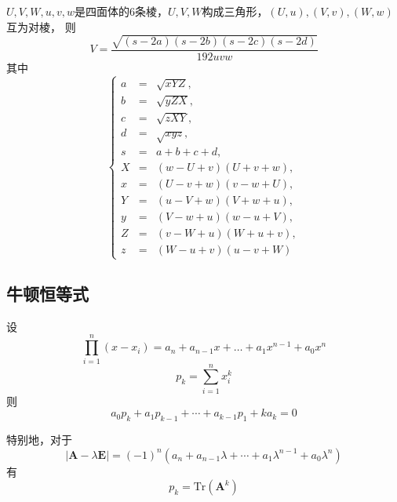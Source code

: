 \documentclass[a4paper]{article}
\begin{document}
$U, V, W, u, v, w$是四面体的$6$条棱，$U, V, W$构成三角形，$(U, u), (V, v), (W, w)$互为对棱，
则$$V = \frac{\sqrt{(s - 2a)(s - 2b)(s - 2c)(s - 2d)}}{192 uvw}$$
其中$$\left\{\begin{array}{lll}
        a & = & \sqrt{xYZ}, \\
        b & = & \sqrt{yZX}, \\
        c & = & \sqrt{zXY}, \\
        d & = & \sqrt{xyz}, \\
        s & = & a + b + c + d, \\ 
        X & = & (w - U + v)(U + v + w), \\
        x & = & (U - v + w)(v - w + U), \\
        Y & = & (u - V + w)(V + w + u), \\
        y & = & (V - w + u)(w - u + V), \\
        Z & = & (v - W + u)(W + u + v), \\
        z & = & (W - u + v)(u - v + W)
    \end{array}\right.$$

\subsection{牛顿恒等式}

设$$\prod_{i = 1}^n{(x - x_i)} = a_n + a_{n - 1} x + \dots + a_1 x^{n - 1} + a_0 x^n$$
$$p_k = \sum_{i = 1}^n{x_i^k}$$
则$$a_0 p_k + a_1 p_{k - 1} + \cdots + a_{k - 1} p_1 + k a_k = 0$$

特别地，对于$$|\mathbf{A} - \lambda \mathbf{E}| = (-1)^n(a_n + a_{n - 1} \lambda + \cdots + a_1 \lambda^{n - 1} + a_0 \lambda^n)$$
有$$p_k = \mathrm{Tr}(\mathbf{A}^k)$$
\end{document}
